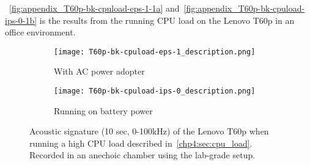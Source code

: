 ~\autoref{fig:appendix_T60p-bk-cpuload-eps-1-1a} and~\autoref{fig:appendix_T60p-bk-cpuload-ips-0-1b} is the results from the running CPU load on the Lenovo T60p in an office environment. 
\begin{figure}[ht]
	\begin{subfigure}{1\textwidth}
	    \centering
	    \texttt{[image: T60p-bk-cpuload-eps-1\_description.png]}
	    \caption{With \gls{AC} power adopter}
	    \label{fig:appendix_T60p-bk-cpuload-eps-1-1a}
    \end{subfigure}
    \begin{subfigure}{1\textwidth}
	    \centering
	    \texttt{[image: T60p-bk-cpuload-ips-0\_description.png]}
	    \caption{Running on battery power}
	    \label{fig:appendix_T60p-bk-cpuload-ips-0-1b}
    \end{subfigure}
    \caption{Acoustic signature (10 sec, 0-100kHz) of the Lenovo T60p when running a high CPU load described in~\autoref{chp4:sec:cpu_load}. Recorded in an anechoic chamber using the lab-grade setup. }
	\label{fig:appendix_T60p-bk-cpuload}
\end{figure}



